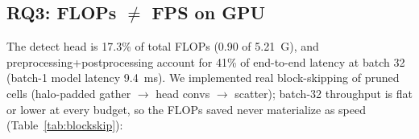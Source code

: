 \documentclass[times,twocolumn,final,authoryear]{elsarticle}
\begin{document}
\subsection{RQ3: FLOPs $\neq$ FPS on GPU}
The detect head is 17.3\% of total FLOPs (0.90 of 5.21~G), and preprocessing+postprocessing account for 41\% of end-to-end latency at batch 32 (batch-1 model latency 9.4~ms). We implemented real block-skipping of pruned cells (halo-padded gather $\to$ head convs $\to$ scatter); batch-32 throughput is flat or lower at every budget, so the FLOPs saved never materialize as speed (Table~\ref{tab:blockskip}):
\begin{table}[h]\centering\footnotesize
\caption{Head-level block skipping neither accelerates inference nor preserves accuracy: halo padding inflates compute and gather/scatter overhead cancels the FLOPs savings (throughput is flat or lower at every budget, 995$\to$991/986/962/911 FPS), and even the halo-only 100\%-budget variant is 19\% slower (805 FPS). The accuracy gap to the mask-level oracle (Table~\ref{tab:budget}) reflects the head seeing pruned features that differ from the full features used to train the gate.}
\label{tab:blockskip}
\end{table}
\end{document}
